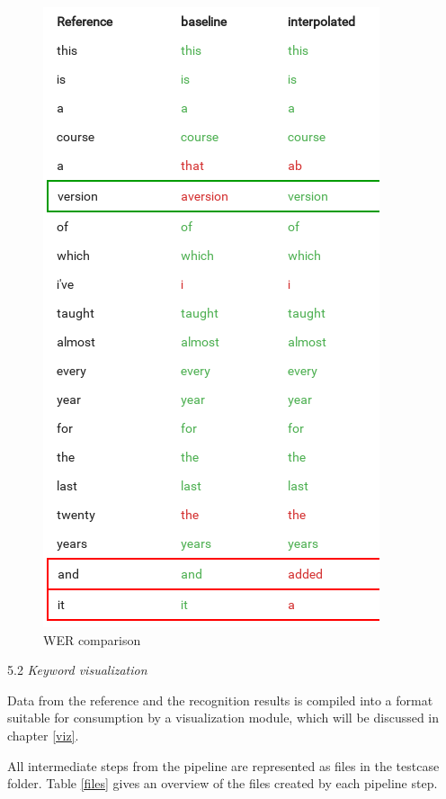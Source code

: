 \documentclass[]{article}
\begin{document}
\begin{enumerate}
  \begin{figure}[htbp]
  \centering
  \includegraphics{images/wer-comparison_150.png}
  \caption{WER comparison\label{wer-comparison}}
  \end{figure}

  5.2 \emph{Keyword visualization}

  Data from the reference and the recognition results is compiled into a
  format suitable for consumption by a visualization module, which will
  be discussed in chapter \ref{viz}.
\end{enumerate}

All intermediate steps from the pipeline are represented as files in the
testcase folder. Table \ref{files} gives an overview of the files
created by each pipeline step.
\end{document}
